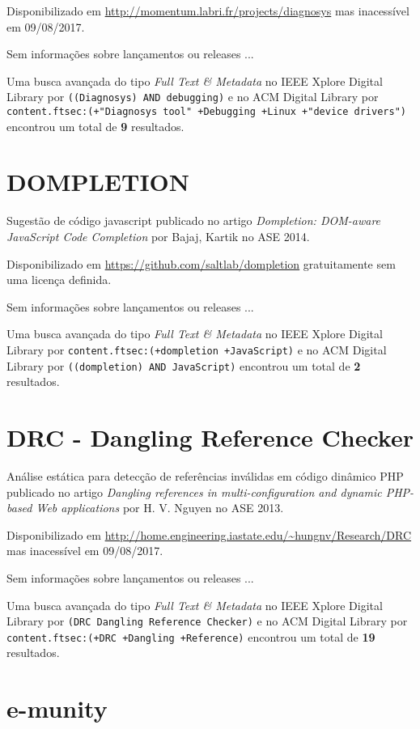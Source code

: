 Disponibilizado em \url{http://momentum.labri.fr/projects/diagnosys}
mas inacessível em 09/08/2017.

Sem informações sobre lançamentos ou releases ...


Uma busca avançada do tipo {\it Full Text \& Metadata} no IEEE Xplore Digital Library por
\texttt{((Diagnosys) AND debugging)}
e no ACM Digital Library por
\texttt{content.ftsec:(+"Diagnosys tool" +Debugging +Linux +"device drivers")}
encontrou um total de
{\bf 9}
resultados.

\section{DOMPLETION}

Sugestão de código javascript
publicado no artigo {\it Dompletion: DOM-aware JavaScript Code Completion}
por Bajaj, Kartik
no ASE 2014.

Disponibilizado em \url{https://github.com/saltlab/dompletion}
gratuitamente
sem uma licença definida.

Sem informações sobre lançamentos ou releases ...


Uma busca avançada do tipo {\it Full Text \& Metadata} no IEEE Xplore Digital Library por
\texttt{content.ftsec:(+dompletion +JavaScript)}
e no ACM Digital Library por
\texttt{((dompletion) AND JavaScript)}
encontrou um total de
{\bf 2}
resultados.

\section{DRC - Dangling Reference Checker}

Análise estática para detecção de referências inválidas em código dinâmico PHP
publicado no artigo {\it Dangling references in multi-configuration and dynamic PHP-based Web applications}
por H. V. Nguyen
no ASE 2013.

Disponibilizado em \url{http://home.engineering.iastate.edu/~hungnv/Research/DRC}
mas inacessível em 09/08/2017.

Sem informações sobre lançamentos ou releases ...


Uma busca avançada do tipo {\it Full Text \& Metadata} no IEEE Xplore Digital Library por
\texttt{(DRC Dangling Reference Checker)}
e no ACM Digital Library por
\texttt{content.ftsec:(+DRC +Dangling +Reference)}
encontrou um total de
{\bf 19}
resultados.

\section{e-munity}

